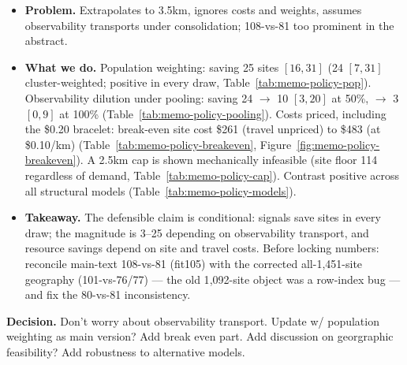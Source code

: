 \documentclass[11pt]{article}
\providecommand{\StructuralRobustnessPath}{appendix/structural-robustness}
\providecommand{\StructuralRobustnessPath}{../appendix/structural-robustness}
\newenvironment{decision}
  {\par\medskip\noindent\begin{minipage}{\linewidth}\color{blue!50!black}\textbf{Decision.} }
  {\end{minipage}\par\medskip}
\begin{document}
\begin{itemize}[nosep]
  \item \textbf{Problem.} Extrapolates to 3.5km, ignores costs and weights, assumes
    observability transports under consolidation; 108-vs-81 too prominent in the
    abstract.
  \item \textbf{What we do.} Population weighting: saving 25 sites $[16,31]$ (24
    $[7,31]$ cluster-weighted; positive in every draw,
    Table~\ref{tab:memo-policy-pop}). Observability dilution under pooling: saving 24
    $\to$ 10 $[3,20]$ at 50\%, $\to$ 3 $[0,9]$ at 100\%
    (Table~\ref{tab:memo-policy-pooling}). Costs priced, including the \$0.20 bracelet:
    break-even site cost \$261 (travel unpriced) to \$483 (at \$0.10/km)
    (Table~\ref{tab:memo-policy-breakeven}, Figure~\ref{fig:memo-policy-breakeven}). A
    2.5km cap is shown mechanically infeasible (site floor 114 regardless of demand,
    Table~\ref{tab:memo-policy-cap}). Contrast positive across all structural models
    (Table~\ref{tab:memo-policy-models}).
  \item \textbf{Takeaway.} The defensible claim is conditional: signals save sites in
    every draw; the magnitude is 3--25 depending on observability transport, and
    resource savings depend on site and travel costs. Before locking numbers: reconcile
    main-text 108-vs-81 (fit105) with the corrected all-1{,}451-site geography
    (101-vs-76/77) --- the old 1{,}092-site object was a row-index bug --- and fix the
    80-vs-81 inconsistency.
\end{itemize}

\begin{decision}
  Don't worry about observability transport. Update w/ population weighting as main version? Add break even part. Add discussion on georgraphic 
  feasibility? Add robustness to alternative models.
\end{decision}

\begin{table}[htbp]
  \centering
  \scriptsize
  \caption{Population weighting in the policy allocation
    (\texttt{sections/policy-population-cost.tex})}
  \label{tab:memo-policy-pop}
\end{table}

\begin{table}[htbp]
  \centering
  \scriptsize
  \caption{Sensitivity to observability dilution under site consolidation}
  \label{tab:memo-policy-pooling}
\end{table}
\end{document}
